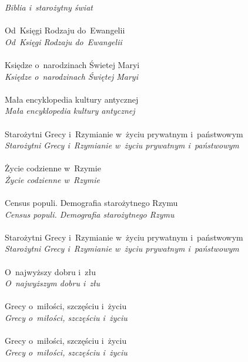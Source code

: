 \documentclass[a4paper,11pt]{article}
\begin{document}
\Powin \textit{Biblia i~starożytny świat} \\
 \\
\Jest  Od~Księgi Rodzaju do~Ewangelii \\
\Powin \textit{Od~Księgi Rodzaju do~Ewangelii} \\
 \\
\Jest  Księdze o~narodzinach Świetej Maryi \\
\Powin \textit{Księdze o~narodzinach Świętej Maryi} \\
 \\
\Jest  Mała encyklopedia kultury antycznej \\
\Powin \textit{Mała encyklopedia kultury antycznej} \\
 \\
\Jest  Starożytni Grecy i~Rzymianie w~życiu prywatnym i~państwowym \\
\Powin \textit{Starożytni Grecy i~Rzymianie w~życiu prywatnym
  i~państwowym} \\
 \\
\Jest  Życie codzienne w~Rzymie \\
\Powin \textit{Życie codzienne w~Rzymie} \\
 \\
\Jest  Census populi. Demografia starożytnego Rzymu \\
\Powin \textit{Census populi. Demografia starożytnego Rzymu} \\
 \\
\Jest  Starożytni Grecy i~Rzymianie w~życiu prywatnym i~państwowym \\
\Powin \textit{Starożytni Grecy i~Rzymianie w~życiu prywatnym
  i~państwowym} \\
 \\
\Jest  O~najwyższy dobru i~złu \\
\Powin \textit{O~najwyższym dobru i~złu} \\
 \\
\Jest  Grecy o~miłości, szczęściu i~życiu \\
\Powin \textit{Grecy o~miłości, szczęściu i~życiu} \\
 \\
\Jest  Grecy o~miłości, szczęściu i~życiu \\
\Powin \textit{Grecy o~miłości, szczęściu i~życiu} \\
 \\
\end{document}
